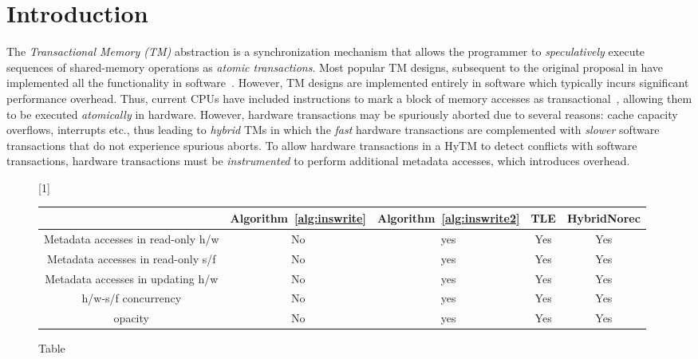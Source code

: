 \section{Introduction}
\label{sec:intro}
%
The \emph{Transactional Memory (TM)} abstraction is a synchronization mechanism 
that allows the programmer to \emph{speculatively} execute sequences of shared-memory
operations as \emph{atomic transactions}.
Most popular TM designs, subsequent to the original proposal in \cite{HM93} 
have implemented all the functionality in software~\cite{norec, ST95,HLM+03, astm, fraser}.
However, TM designs are implemented entirely in software which typically incurs significant performance overhead.
Thus, current CPUs have included instructions to mark a block of memory accesses as transactional~\cite{Rei12, asf, bluegene}, allowing them to be executed \emph{atomically} in hardware.
However, hardware transactions may be spuriously aborted due to several reasons: cache capacity overflows, interrupts etc., thus leading to \emph{hybrid} TMs 
in which the \emph{fast} hardware transactions are complemented with \emph{slower} software transactions that do not experience spurious aborts.
To allow hardware transactions in a HyTM to detect conflicts with software transactions, hardware transactions must be \emph{instrumented} to perform additional metadata accesses, which introduces overhead.

\begin{figure*}[!ht]
      
     \scalebox{1}[1]{
     \begin{tabularx}{\textwidth}{c|c|c|c|c}
	~~~~~ & Algorithm~\ref{alg:inswrite} & Algorithm~\ref{alg:inswrite2} & TLE & HybridNorec\\ \hline
	Metadata accesses in read-only h/w & No & yes & Yes & Yes \\ \hline
	Metadata accesses in read-only s/f & No & yes & Yes & Yes \\ \hline
	Metadata accesses in updating h/w & No & yes & Yes & Yes \\ \hline
	h/w-s/f concurrency & No & yes & Yes & Yes \\ \hline
	opacity & No & yes & Yes & Yes \\  \hline
   \end{tabularx}
\caption{Table}\label{fig:main}    
}
\end{figure*}